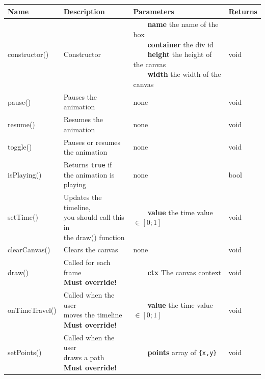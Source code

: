 \documentclass{article}
\newcommand{\tabitem}{~~\llap{\textbullet}~~}
\begin{document}
\bgroup{}
\def\arraystretch{1.5}
\begin{center}
    \begin{tabular}{ |l|l|l|l|}
        \hline
        \textbf{Name} & \textbf{Description} & \textbf{Parameters} & \textbf{Returns} \\
        \hline
        constructor() & Constructor &
        \makecell[l]{
            \tabitem \textbf{name} the name of the box \\
            \tabitem \textbf{container} the div id \\
            \tabitem \textbf{height} the height of the canvas \\
            \tabitem \textbf{width} the width of the canvas
        } & void \\
        \hline
        pause() & Pauses the animation & none & void \\
        \hline
        resume() & Resumes the animation & none & void \\
        \hline
        toggle() & \makecell[l]{Pauses or resumes \\ the animation} & none & void \\
        \hline
        isPlaying() &
        \makecell[l]{
            Returns \texttt{true} if \\
            the animation is playing
        } & none & bool \\
        \hline
        setTime() &
        \makecell[l]{
            Updates the timeline, \\
            you should call this in \\
            the draw() function}
        & \tabitem \textbf{value} the time value \(\in [0;1]\) & void \\
        \hline
        clearCanvas() & Clears the canvas & none & void \\
        \hline
        draw() &
        \makecell[l]{
            Called for each frame \\
            \textbf{Must override!}
        } & \tabitem \textbf{ctx} The canvas context & void \\
        \hline
        onTimeTravel() &
        \makecell[l]{
            Called when the user \\
            moves the timeline \\
            \textbf{Must override!}
        } & \tabitem \textbf{value} the time value \(\in [0;1]\) & void \\
        \hline
        setPoints() &
        \makecell[l]{
            Called when the user \\
            draws a path \\
            \textbf{Must override!}
        } & \tabitem \textbf{points} array of \texttt{\{x,y\}} & void \\
        \hline
    \end{tabular}
\end{center}
\egroup{}
\end{document}
